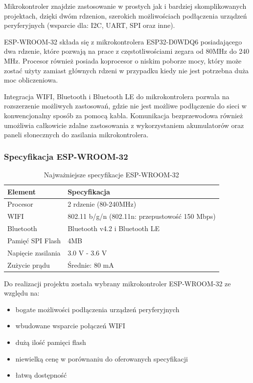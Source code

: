 \documentclass[12pt,a4paper]{article}
\begin{document}
Mikrokontroler znajdzie zastosowanie w prostych jak i bardziej skomplikowanych projektach, dzięki dwóm rdzenion, szerokich możliwościach podłączenia urządzeń peryferyjnych (wsparcie dla: I2C, UART, SPI oraz inne).

ESP-WROOM-32 składa się z mikrokontrolera ESP32-D0WDQ6 posiadającego dwa rdzenie, które pozwają na prace z częstotliwościami zegara od 80MHz do 240 MHz. Procesor również posiada koprocesor o niskim poborze mocy, który może zostać użyty zamiast głównych rdzeni w przypadku kiedy nie jest potrzebna duża moc obliczeniowa.

Integracja WIFI, Bluetooth i Bluetooth LE do mikrokontrolera pozwala na rozszerzenie możliwych zastosowań, gdzie nie jest możliwe podłączenie do sieci w konwencjonalny sposób za pomocą kabla. Komunikacja bezprzewodowa również umożliwia całkowicie zdalne zastosowania z wykorzystaniem akumulatorów oraz paneli słonecznych do zasilania mikrokontrolera.

\subsubsection{Specyfikacja ESP-WROOM-32}

\begin{table}[H]
    \centering
    \begin{tabular}{|l|l|}
        \hline
        Element & Specyfikacja \\
        \hline
        Procesor & 2 rdzenie (80-240MHz) \\
        \hline
        WIFI & 802.11 b/g/n (802.11n: przepustowość 150 Mbps) \\
        \hline
        Bluetooth & Bluetooth v4.2 i Bluetooth LE \\
        \hline
        Pamięć SPI Flash & 4MB \\
        \hline
        Napięcie zasilania & 3.0 V - 3.6 V \\
        \hline
        Zużycie prądu & Średnie: 80 mA \\
        \hline
    \end{tabular}
    \caption{Najważniejsze specyfikacje ESP-WROOM-32}
    \label{esp32-spec}
\end{table}

Do realizacji projektu została wybrany mikrokontroler ESP-WROOM-32 ze względu na:
\begin{itemize}
    \item bogate możliwości podłączenia urządzeń peryferyjnych
    \item wbudowane wsparcie połączeń WIFI
    \item dużą ilość pamięci flash
    \item niewielką cenę w porównaniu do oferowanych specyfikacji
    \item łatwą dostępność
\end{itemize}
\end{document}
